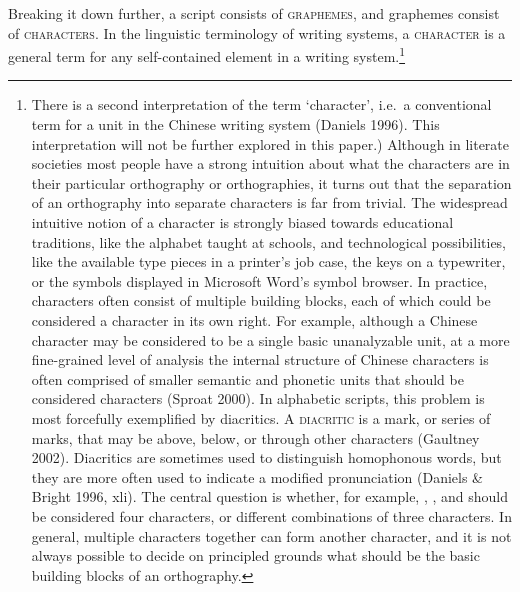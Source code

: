 {{{{{{{{{Breaking it down further, a script consists of \textsc{graphemes}, and graphemes consist of \textsc{characters}. In the linguistic terminology of writing systems, a \textsc{character} is a general term for any self-contained element in a writing system.\footnote{There is a second interpretation of the term `character', i.e.~a conventional term for a unit in the Chinese writing system (Daniels 1996). This interpretation will not be further explored in this paper.) Although in literate societies most people have a strong intuition about what the characters are in their particular orthography or orthographies, it turns out that the separation of an orthography into separate characters is far from trivial. The widespread intuitive notion of a character is strongly biased towards educational traditions, like the alphabet taught at schools, and technological possibilities, like the available type pieces in a printer's job case, the keys on a typewriter, or the symbols displayed in Microsoft Word's symbol browser. In practice, characters often consist of multiple building blocks, each of which could be considered a character in its own right. For example, although a Chinese character may be considered to be a single basic unanalyzable unit, at a more fine-grained level of analysis the internal structure of Chinese characters is often comprised of smaller semantic and phonetic units that should be considered characters (Sproat 2000). In alphabetic scripts, this problem is most forcefully exemplified by diacritics. A \textsc{diacritic} is a mark, or series of marks, that may be above, below, or through other characters (Gaultney 2002). Diacritics are sometimes used to distinguish homophonous words, but they are more often used to indicate a modified pronunciation (Daniels \& Bright 1996, xli). The central question is whether, for example, , , and should be considered four characters, or different combinations of three characters. In general, multiple characters together can form another character, and it is not always possible to decide on principled grounds what should be the basic building blocks of an orthography.

}}}}}}}}}}
